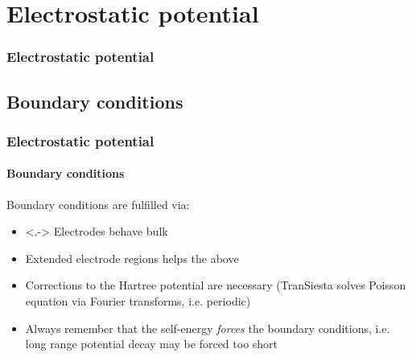 \section{Electrostatic potential}

\begin{framenologo}
  \frametitle{Electrostatic potential}
  \tableofcontents[currentsection]
\end{framenologo}

\subsection{Boundary conditions}

\begin{frame}
  \frametitle{Electrostatic potential}
  \framesubtitle{Boundary conditions}

  Boundary conditions are fulfilled via:
  \begin{itemize}[<+->]
    \item<.-> Electrodes behave bulk

    \item Extended electrode regions helps the above

    \item Corrections to the Hartree potential are necessary (TranSiesta solves Poisson
    equation via Fourier transforms, i.e. periodic)

    \item Always remember that the self-energy \emph{forces} the boundary conditions,
    i.e. long range potential decay may be forced too short

  \end{itemize}

\end{frame}

